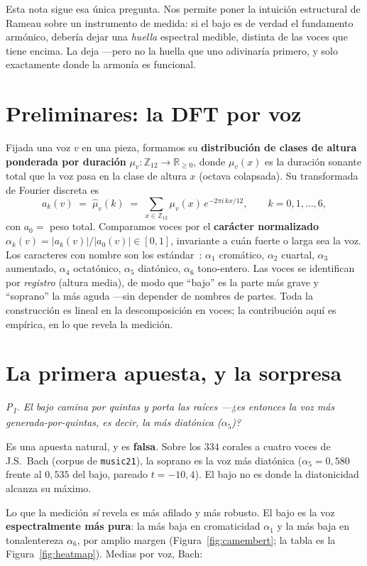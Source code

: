 \documentclass[11pt]{article}
\newcommand{\lean}[1]{\texttt{#1}}
\newcommand{\Ztwelve}{\mathbb{Z}_{12}}
\newcommand{\question}[1]{\smallskip\noindent\textit{#1}\smallskip}
\begin{document}
Esta nota sigue esa única pregunta. Nos permite poner la intuición estructural de Rameau sobre un
instrumento de medida: si el bajo es de verdad el fundamento armónico, debería dejar una \emph{huella}
espectral medible, distinta de las voces que tiene encima. La deja ---pero no la huella que uno adivinaría
primero, y solo exactamente donde la armonía es funcional.

\section{Preliminares: la DFT por voz}\label{sec:setup}

Fijada una voz $v$ en una pieza, formamos su \textbf{distribución de clases de altura ponderada por
duración} $\mu_v:\Ztwelve\to\mathbb{R}_{\ge 0}$, donde $\mu_v(x)$ es la duración sonante total que la voz
pasa en la clase de altura $x$ (octava colapsada). Su transformada de Fourier discreta es
\[
  a_k(v)\;=\;\hat\mu_v(k)\;=\;\sum_{x\in\Ztwelve}\mu_v(x)\,e^{-2\pi i\,kx/12},\qquad k=0,1,\dots,6,
\]
con $a_0=$ peso total. Comparamos voces por el \textbf{carácter normalizado}
$\alpha_k(v)=|a_k(v)|/|a_0(v)|\in[0,1]$, invariante a cuán fuerte o larga sea la voz. Los caracteres con
nombre son los estándar~\cite{Amiot,Yust2019}: $\alpha_1$ cromático, $\alpha_2$ cuartal, $\alpha_3$
aumentado, $\alpha_4$ octatónico, $\alpha_5$ diatónico, $\alpha_6$ tono-entero. Las voces se identifican por
\emph{registro} (altura media), de modo que ``bajo'' es la parte más grave y ``soprano'' la más aguda
---sin depender de nombres de partes. Toda la construcción es lineal en la descomposición en voces; la
contribución aquí es empírica, en lo que revela la medición.

\section{La primera apuesta, y la sorpresa}\label{sec:law}

\question{P\textsubscript{1}. El bajo camina por quintas y porta las raíces ---¿es entonces la voz más
generada-por-quintas, es decir, la más \emph{diatónica} ($\alpha_5$)?}

Es una apuesta natural, y es \textbf{falsa}. Sobre los $334$ corales a cuatro voces de J.S.~Bach (corpus de
\lean{music21}), la soprano es la voz más diatónica ($\alpha_5=0{,}580$ frente al $0{,}535$ del bajo,
pareado $t=-10{,}4$). El bajo no es donde la diatonicidad alcanza su máximo.

Lo que la medición \emph{sí} revela es más afilado y más robusto. El bajo es la voz \textbf{espectralmente
más pura}: la más baja en cromaticidad $\alpha_1$ y la más baja en tonalentereza $\alpha_6$, por amplio
margen (Figura~\ref{fig:camembert}; la tabla es la Figura~\ref{fig:heatmap}). Medias por voz, Bach:
\end{document}

